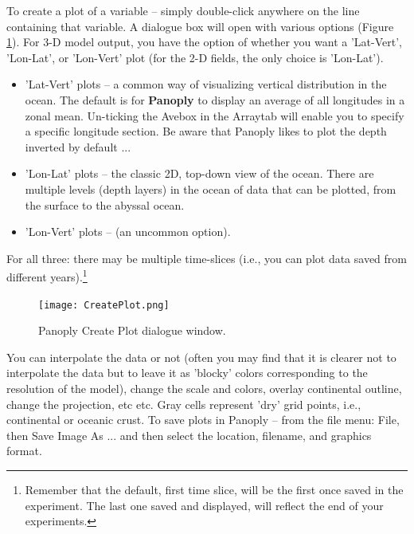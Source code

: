 \documentclass[11pt,fleqn]{book} %
\begin{document}
To create a plot of a variable -- simply double-click anywhere on the line containing that variable. A dialogue box will open with various options (Figure \ref{fig:CreatePlot}). For 3-D model output, you have the option of whether you want a \footnotesize\textsf{'Lat-Vert'}\normalsize, \footnotesize\textsf{'Lon-Lat'}\normalsize, or \footnotesize\textsf{'Lon-Vert' }\normalsize plot (for the 2-D fields, the only choice is \footnotesize\textsf{'Lon-Lat'}\normalsize).
\begin{itemize}
\item \footnotesize\textsf{'Lat-Vert' }\normalsize plots -- a common way of visualizing vertical distribution in the ocean. The default is for \textbf{Panoply} to display an average of all longitudes in a zonal mean. Un-ticking the \footnotesize\textsf{Ave}\normalsize box in the \footnotesize\textsf{Array}\normalsize tab will enable you to specify a specific longitude section. Be aware that Panoply likes to plot the depth inverted by default ...
\item \footnotesize\textsf{'Lon-Lat' }\normalsize plots -- the classic 2D, top-down view of the ocean. There are multiple levels (depth layers) in the ocean of data that can be plotted, from the surface to the abyssal ocean.
\item \footnotesize\textsf{'Lon-Vert' }\normalsize plots -- (an uncommon option).
\end{itemize}
For all three: there may be multiple time-slices (i.e., you can plot data saved from different years).\footnote{Remember that the default, first time slice, will be the first once saved in the experiment. The last one saved and displayed, will reflect the end of your experiments.} 

\begin{figure}[ht]
\begin{center}
\texttt{[image: CreatePlot.png]}
\end{center}
\caption{Panoply Create Plot dialogue window.}
\label{fig:CreatePlot}
\end{figure}

You can interpolate the data or not (often you may find that it is clearer not to interpolate the data but to leave it as 'blocky' colors corresponding to the resolution of the model), change the scale and colors, overlay continental outline, change the projection, etc etc. Gray cells represent 'dry' grid points, i.e., continental or oceanic crust.
To save plots in Panoply -- from the file menu: \footnotesize\textsf{File}\normalsize, then \footnotesize\textsf{Save Image As ... }\normalsize and then select the location, filename, and graphics format.
\end{document}
